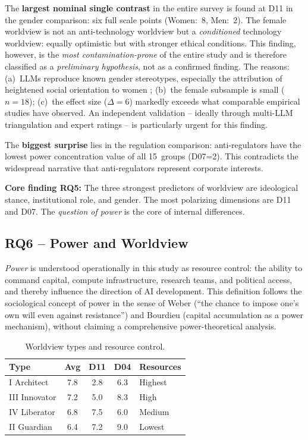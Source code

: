 \documentclass[12pt,a4paper]{article}
\begin{document}
The \textbf{largest nominal single contrast} in the entire survey is found at D11 in the gender comparison: six full scale points (Women:~8, Men:~2). The female worldview is not an anti-technology worldview but a \emph{conditioned} technology worldview: equally optimistic but with stronger ethical conditions. This finding, however, is the \emph{most contamination-prone} of the entire study and is therefore classified as a \emph{preliminary hypothesis}, not as a confirmed finding. The reasons: (a)~LLMs reproduce known gender stereotypes, especially the attribution of heightened social orientation to women \citep{Santurkar2023}; (b)~the female subsample is small ($n = 18$); (c)~the effect size ($\Delta = 6$) markedly exceeds what comparable empirical studies have observed. An independent validation -- ideally through multi-LLM triangulation and expert ratings -- is particularly urgent for this finding.

The \textbf{biggest surprise} lies in the regulation comparison: anti-regulators have the lowest power concentration value of all 15~groups (D07=2). This contradicts the widespread narrative that anti-regulators represent corporate interests.

\medskip
\noindent\textbf{Core finding RQ5:} The three strongest predictors of worldview are ideological stance, institutional role, and gender. The most polarizing dimensions are D11 and D07. The \emph{question of power} is the core of internal differences.


\subsection{RQ6 -- Power and Worldview}
\label{sec:ergebnisse:f6}

\emph{Power} is understood operationally in this study as resource control: the ability to command capital, compute infrastructure, research teams, and political access, and thereby influence the direction of AI development. This definition follows the sociological concept of power in the sense of Weber (``the chance to impose one's own will even against resistance'') and Bourdieu (capital accumulation as a power mechanism), without claiming a comprehensive power-theoretical analysis.

\begin{table}[htbp]
  \centering
  \caption{Worldview types and resource control.}
  \label{tab:macht}
  \begin{tabular}{l c c c l}
    \toprule
    \textbf{Type} & \textbf{Avg} & \textbf{D11} & \textbf{D04} & \textbf{Resources} \\
    \midrule
    I Architect   & 7.8 & 2.8 & 6.3 & Highest \\
    III Innovator & 7.2 & 5.0 & 8.3 & High \\
    IV Liberator  & 6.8 & 7.5 & 6.0 & Medium \\
    II Guardian   & 6.4 & 7.2 & 9.0 & Lowest \\
    \bottomrule
  \end{tabular}
\end{table}
\end{document}
